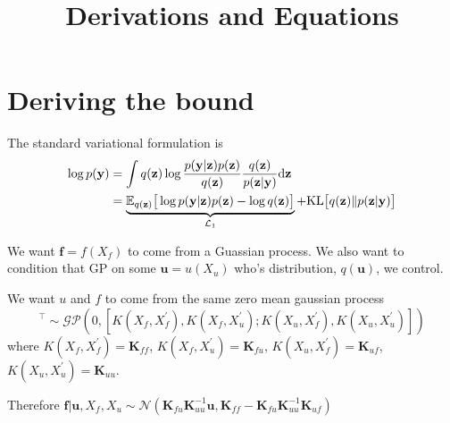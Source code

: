 \documentclass[12pt]{article}
\title{\textbf{Derivations and Equations}}
\date{}
\newcommand{\ub}{\mathbf{u}}
\newcommand{\zb}{\mathbf{z}}
\newcommand{\fb}{\mathbf{f}}
\newcommand{\yb}{\mathbf{y}}
\newcommand{\dd}{\mathrm{d}}
\newcommand{\Lo}{\mathcal{L}_1}
\newcommand{\Kff}{\mathbf{K}_{ff}}
\newcommand{\Kuu}{\mathbf{K}_{uu}}
\newcommand{\Kuf}{\mathbf{K}_{uf}}
\newcommand{\Kfu}{\mathbf{K}_{fu}}
\newcommand{\KL}{\mathrm{KL}}
\begin{document}
\maketitle


\section{Deriving the bound} %
\label{sec:derive_bound}
The standard variational formulation is
%
\begin{align}
    \log p(\yb) &= \int q(\zb)\log\frac{p(\yb|\zb)p(\zb)}{q(\zb)}\frac{q(\zb)}{p(\zb|\yb)} \dd\zb\notag\\
    &= \underbrace{\mathbb{E}_{q(\zb)}\big[ \log p(\yb|\zb)p(\zb) - \log q(\zb) \big]}_{\Lo} + \KL\big[ q(\zb)\Vert p(\zb|\yb) \big]\label{eq:logpy1}
\end{align}

We want $\fb = f(X_f)$ to come from a Guassian process. We also want to condition that GP on some $\ub=u(X_u)$ who's distribution, $q(\ub)$, we control.

We want $u$ and $f$ to come from the same zero mean gaussian process
%
\begin{equation}
    [f(X_f),u(X_u)]^\top \sim \mathcal{GP}(0,[K(X_f,X_f^\prime),K(X_f,X_u^\prime);K(X_u,X_f^\prime),K(X_u,X_u^\prime)])
\end{equation}
%
where $K(X_f,X_f^\prime) = \Kff$, $K(X_f,X_u^\prime) = \Kfu$, $ K(X_u,X_f^\prime) = \Kuf$, $K(X_u,X_u^\prime) = \Kuu$.

Therefore $\fb|\ub,X_f,X_u \sim \mathcal{N}(\Kfu\Kuu^{-1}\ub, \Kff - \Kfu\Kuu^{-1}\Kuf)$
\end{document}
